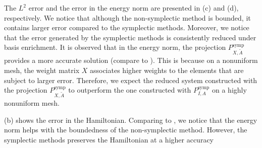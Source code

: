 The $L^2$ error and the error in the energy norm are presented in (c) and (d), respectively. We notice that although the non-symplectic method is bounded, it contains larger error compared to the symplectic methods. Moreover, we notice that the error generated by the symplectic methods is consistently reduced under basis enrichment. It is observed that in the energy norm, the projection $P_{X,\tilde A}^{\text{symp}}$ provides a more accurate solution (compare to ). This is because on a nonuniform mesh, the weight matrix $X$ associates higher weights to the elements that are subject to larger error. Therefore, we expect the reduced system constructed with the projection $P_{X,\tilde A}^{\text{symp}}$ to outperform the one constructed with $P_{I,A}^{\text{symp}}$ on a highly nonuniform mesh.

(b) shows the error in the Hamiltonian. Comparing to , we notice that the energy norm helps with the boundedness of the non-symplectic method. However, the symplectic methods preserves the Hamiltonian at a higher accuracy

